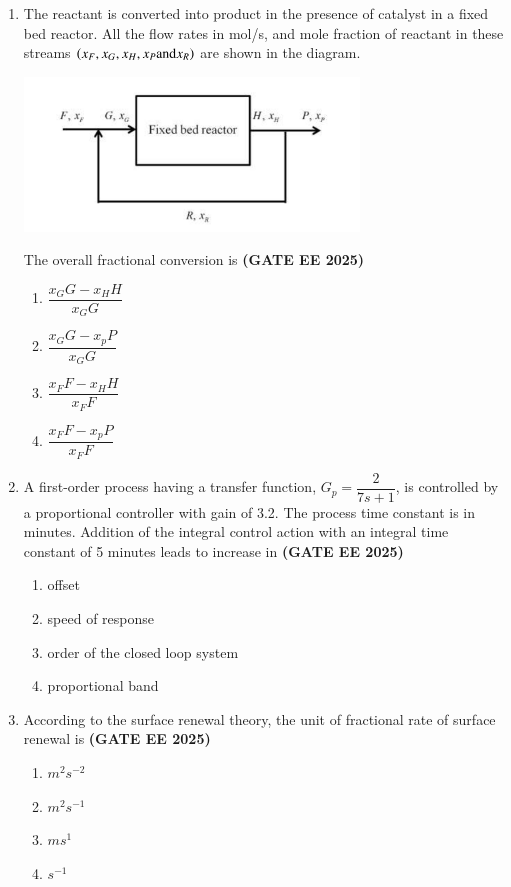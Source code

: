 \documentclass[journal,12pt,onecolumn]{IEEEtran}
\theoremstyle{remark}
\begin{document}
\begin{enumerate}
\item  The reactant  is converted into product  in the presence of catalyst in a fixed bed reactor. All the flow rates  in mol/s, and mole fraction of reactant  in these streams $\left(x_F, x_G, x_H, x_P \text{and} x_R\right)$ are shown in the diagram.
\begin{center}
\includegraphics[width=0.7\textwidth]{figs/17.png}
\end{center}
The overall fractional conversion is
\hfill \textbf{(GATE EE 2025)} \begin{enumerate}
    \item $\dfrac{x_{G}G-x_{H}H}{x_{G}G}$
    \item $\dfrac{x_{G}G-x_{p}P}{x_{G}G}$
    \item $\dfrac{x_{F}F-x_{H}H}{x_{F}F}$
    \item $\dfrac{x_{F}F-x_{p}P}{x_{F}F}$
\end{enumerate}


\item A first-order process having a transfer function, $G_{p}=\dfrac{2}{7s+1}$, is controlled by a proportional controller with gain of 3.2. The process time constant is in minutes. Addition of the integral control action with an integral time constant of 5 minutes leads to increase in
\hfill \textbf{(GATE EE 2025)} \begin{enumerate}
    \item offset
    \item speed of response
    \item order of the closed loop system
    \item proportional band
\end{enumerate}


\item According to the surface renewal theory, the unit of fractional rate of surface renewal is
\hfill \textbf{(GATE EE 2025)} \begin{enumerate}
    \item $m^{2}s^{-2}$
    \item $m^{2}s^{-1}$
    \item $ms^{1}$
    \item $s^{-1}$
\end{enumerate}



\end{enumerate}
\end{document}

